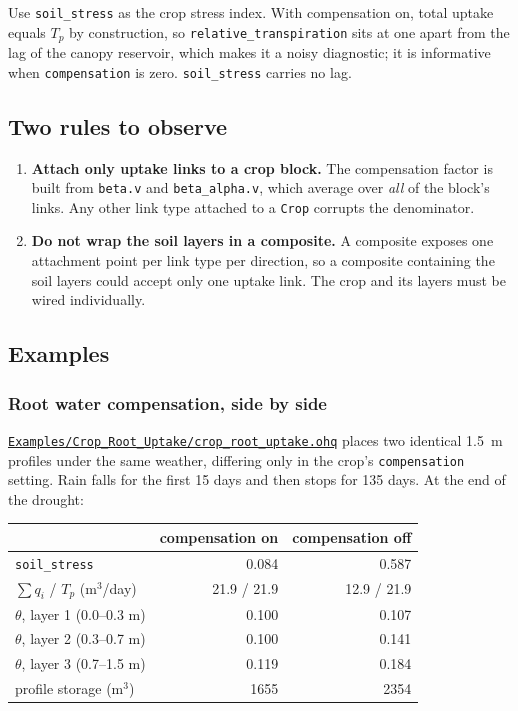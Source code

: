 \documentclass[11pt,a4paper]{article}
\newcommand{\code}[1]{\texttt{\small #1}}
\newcommand{\file}[1]{\texttt{\small #1}}
\newcommand{\ghbase}{https://github.com/ArashMassoudieh/OpenHydroQual/blob/master}
\newcommand{\exfile}[1]{\href{\ghbase/#1}{\file{#1}}}
\begin{document}
\noindent
Use \code{soil\_stress} as the crop stress index. With compensation on, total
uptake equals $T_p$ by construction, so \code{relative\_transpiration} sits at
one apart from the lag of the canopy reservoir, which makes it a noisy
diagnostic; it is informative when \code{compensation} is zero.
\code{soil\_stress} carries no lag.

\subsection{Two rules to observe}

\begin{enumerate}[leftmargin=1.4cm]
\item \textbf{Attach only uptake links to a crop block.} The compensation factor
  is built from \code{beta.v} and \code{beta\_alpha.v}, which average over
  \emph{all} of the block's links. Any other link type attached to a
  \code{Crop} corrupts the denominator.
\item \textbf{Do not wrap the soil layers in a composite.} A composite exposes
  one attachment point per link type per direction, so a composite containing
  the soil layers could accept only one uptake link. The crop and its layers
  must be wired individually.
\end{enumerate}

\subsection{Examples}

\subsubsection*{Root water compensation, side by side}

\exfile{Examples/Crop\_Root\_Uptake/crop\_root\_uptake.ohq} places two identical
1.5~m profiles under the same weather, differing only in the crop's
\code{compensation} setting. Rain falls for the first 15 days and then stops for
135 days. At the end of the drought:

\begin{center}
\begin{tabular}{@{}lrr@{}}
\toprule
 & \textbf{compensation on} & \textbf{compensation off} \\
\midrule
\code{soil\_stress}                        & 0.084 & 0.587 \\
$\sum q_i$ / $T_p$ \; (m$^3$/day)          & 21.9 / 21.9 & 12.9 / 21.9 \\
$\theta$, layer 1 (0.0--0.3 m)             & 0.100 & 0.107 \\
$\theta$, layer 2 (0.3--0.7 m)             & 0.100 & 0.141 \\
$\theta$, layer 3 (0.7--1.5 m)             & 0.119 & 0.184 \\
profile storage (m$^3$)                    & 1655  & 2354 \\
\bottomrule
\end{tabular}
\end{center}
\end{document}
